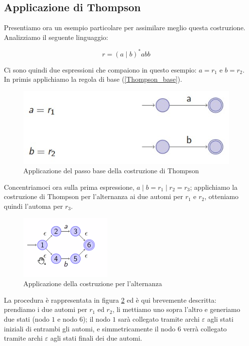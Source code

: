 \documentclass[class=book, crop=false, oneside, 12pt]{standalone}
\begin{document}
\subsection{Applicazione di Thompson}
Presentiamo ora un esempio particolare per assimilare meglio questa costruzione. Analizziamo il seguente linguaggio:

\begin{equation}
    r = (a \mid b)^\ast abb
\end{equation}

\noindent Ci sono quindi due espressioni che compaiono in questo esempio: \(a = r_1\) e \(b = r_2\).
In primis applichiamo la regola di base (\ref{Thompson_base}).

\begin{figure}
    \centering
    \includegraphics[width=.7\textwidth,keepaspectratio]{esempio_Thompson_0}
    \caption{Applicazione del passo base della costruzione di Thompson}
    \label{esempio_Thompson_0}
\end{figure}

Concentriamoci ora sulla prima espressione, \( a \mid b = r_1 \mid r_2 = r_3\); applichiamo la costruzione di Thompson per l’alternanza ai due automi per \(r_1\) e \(r_2\), otteniamo quindi l’automa per \(r_3\).

\begin{figure}
    \centering
    \includegraphics[width=.4\textwidth,keepaspectratio]{esempio_Thompson_1}
    \caption{Applicazione della costruzione per l'alternanza}
    \label{esempio_Thompson_1}
\end{figure}

La procedura è rappresentata in figura \ref{esempio_Thompson_1} ed è qui brevemente descritta: prendiamo i due automi per \(r_1\) ed \(r_2\), li mettiamo uno sopra l’altro e generiamo due stati (nodo \(1\) e nodo \(6\)); il nodo \(1\) sarà collegato tramite archi \(\varepsilon\) agli stati iniziali di entrambi gli automi, e simmetricamente il nodo \(6\) verrà collegato tramite archi \(\varepsilon\) agli stati finali dei due automi.
\end{document}

